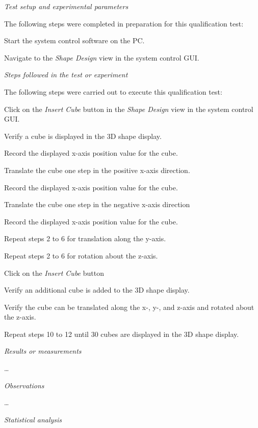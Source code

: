 \textit{Test setup and experimental parameters}

The following steps were completed in preparation for this qualification test:
\begin{compactitem}
	\item Start the system control software on the PC.
	\item Navigate to the \textit{Shape Design} view in the system control GUI.
\end{compactitem}

\textit{Steps followed in the test or experiment}

The following steps were carried out to execute this qualification test:

\begin{compactenum}
	\item Click on the \textit{Insert Cube} button in the \textit{Shape Design} view in the system control GUI.
	\item Verify a cube is displayed in the 3D shape display.
	\item Record the displayed x-axis position value for the cube.
	\item Translate the cube one step in the positive x-axis direction.
	\item Record the displayed x-axis position value for the cube.
	\item Translate the cube one step in the negative x-axis direction
	\item Record the displayed x-axis position value for the cube.
	\item Repeat steps 2 to 6 for translation along the y-axis.
	\item Repeat steps 2 to 6 for rotation about the z-axis.
	\item Click on the \textit{Insert Cube} button
	\item Verify an additional cube is added to the 3D shape display.
	\item Verify the cube can be translated along the x-, y-, and z-axis and rotated about the z-axis.
	\item Repeat steps 10 to 12 until 30 cubes are displayed in the 3D shape display.
\end{compactenum}

\textit{Results or measurements}

\ldots

\textit{Observations}

\ldots

\textit{Statistical analysis}

